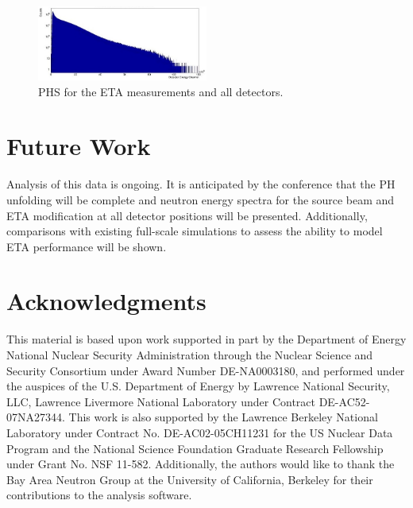\documentclass[twocolumn,10pt,final]{asme2ej}
\begin{document}
\vspace{-0.4 cm}
\begin{figure} [htp!]
 \centering
 \includegraphics[trim = 0cm 0cm 0cm 0cm, clip, width=0.5\textwidth]{../Figs/phs.jpg}
   \caption{PHS for the ETA measurements and all detectors.}
  \label{PHS}
\vspace{-0.4 cm}
\end{figure}

\vspace{-0.4 cm}
\section{Future Work} \label{sec:future-work}

Analysis of this data is ongoing.
It is anticipated by the conference that the PH unfolding will be complete and neutron energy spectra for the source beam and ETA modification at all detector positions will be presented.
Additionally, comparisons with existing full-scale simulations to assess the ability to model ETA performance will be shown. 


\vspace{-0.4 cm}
\section*{Acknowledgments}
This material is based upon work supported in part by the Department of Energy National Nuclear Security Administration through the Nuclear Science and Security Consortium under Award Number DE-NA0003180, and performed under the auspices of the U.S. Department of Energy by Lawrence National Security, LLC, Lawrence Livermore National Laboratory under Contract DE-AC52-07NA27344. 
This work is also supported by the Lawrence Berkeley National Laboratory under Contract No. DE-AC02-05CH11231 for the US Nuclear Data Program and the National Science Foundation Graduate Research Fellowship under Grant No. NSF 11-582.
Additionally, the authors would like to thank the Bay Area Neutron Group at the University of California, Berkeley for their contributions to the analysis software.
\end{document}
